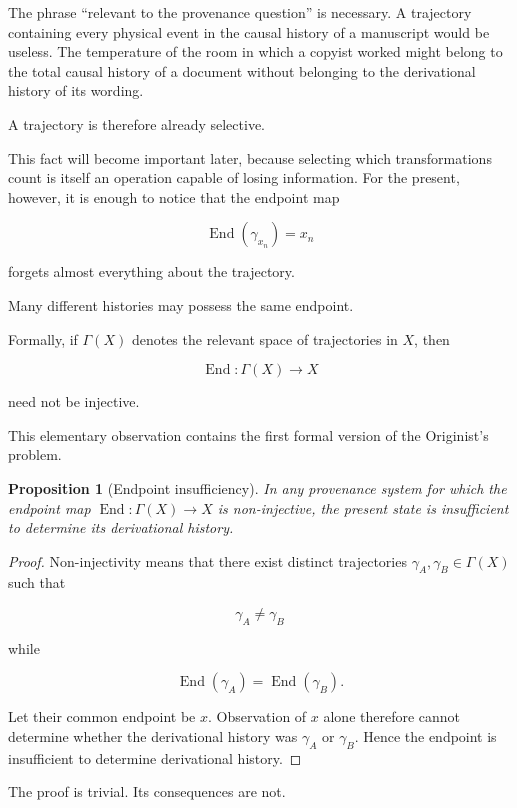 \documentclass[
  11pt,
  a4paper,
  DIV=12,
  BCOR=0mm,
  parskip=half-
]{scrartcl}
\newcommand{\traj}[1]{\gamma_{#1}}
\newcommand{\End}{\operatorname{End}}
\theoremstyle{definition}
\theoremstyle{plain}
\newtheorem{proposition}[definition]{Proposition}
\theoremstyle{remark}
\begin{document}
The phrase \enquote{relevant to the provenance question} is necessary. A
trajectory containing every physical event in the causal history of a
manuscript would be useless. The temperature of the room in which a copyist
worked might belong to the total causal history of a document without
belonging to the derivational history of its wording.

A trajectory is therefore already selective.

This fact will become important later, because selecting which transformations
count is itself an operation capable of losing information. For the present,
however, it is enough to notice that the endpoint map

\[
  \End(\traj{x_n})=x_n
\]

forgets almost everything about the trajectory.

Many different histories may possess the same endpoint.

Formally, if \(\Gamma(X)\) denotes the relevant space of trajectories in
\(X\), then

\[
  \End:\Gamma(X)\longrightarrow X
\]

need not be injective.

This elementary observation contains the first formal version of the
Originist's problem.

\begin{proposition}[Endpoint insufficiency]
\label{prop:endpoint-insufficiency}
In any provenance system for which the endpoint map
\(\End:\Gamma(X)\rightarrow X\) is non-injective, the present state is
insufficient to determine its derivational history.
\end{proposition}

\begin{proof}
Non-injectivity means that there exist distinct trajectories
\(\gamma_A,\gamma_B\in\Gamma(X)\) such that

\[
  \gamma_A\neq\gamma_B
\]

while

\[
  \End(\gamma_A)=\End(\gamma_B).
\]

Let their common endpoint be \(x\). Observation of \(x\) alone therefore
cannot determine whether the derivational history was \(\gamma_A\) or
\(\gamma_B\). Hence the endpoint is insufficient to determine derivational
history.
\end{proof}

The proof is trivial. Its consequences are not.

\end{document}
